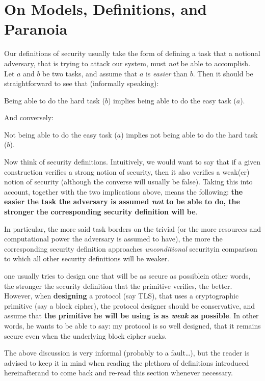 \section{On Models, Definitions, and Paranoia}
  \label{sec:on_mdp}
  Our definitions of security usually take the form of defining a task that a notional adversary, that is trying to attack our system, must \emph{not} be able to accomplish. Let $a$ and $b$ be two tasks, and assume that $a$ is \emph{easier} than $b$. Then it should be straightforward to see that (informally speaking):
  \begin{center}
    Being able to do the hard task ($b$) implies being able to do the easy task ($a$).
  \end{center}
  And conversely:
  \begin{center}
    Not being able to do the easy task ($a$) implies not being able to do the hard task ($b$).
  \end{center}
  Now think of security definitions. Intuitively, we would want to say that if a given construction verifies a strong notion of security, then it also verifies a weak(er) notion of security (although the converse will usually be false). Taking this into account, together with the two implications above, means the following: \textbf{the easier the task the adversary is assumed \textit{not} to be able to do, the stronger the corresponding security definition will be}.

  In particular, the more said task borders on the trivial (or the more resources and computational power the adversary is assumed to have), the more the corresponding security definition approaches \emph{unconditional} security\emd in comparison to which all other security definitions will be weaker.

  \medskip

   one usually tries to design one that will be as secure as possible\emd in other words, the stronger the security definition that the primitive verifies, the better. However, when \textbf{designing} a protocol (say TLS), that uses a cryptographic primitive (say a block cipher), the protocol designer should be conservative, and assume that \textbf{the primitive he will be using is as \textit{weak} as possible}. In other words, he wants to be able to say: my protocol is so well designed, that it remains secure even when the underlying block cipher sucks.

  \bigskip

  \noindent The above discussion is very informal (probably to a fault\dots), but the reader is advised to keep it in mind when reading the plethora of definitions introduced hereinafter\emd and to come back and re-read this section whenever necessary.

